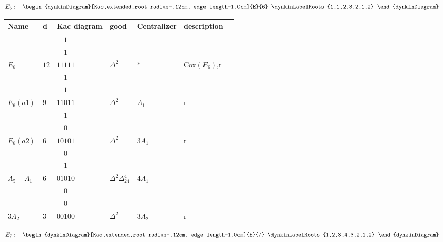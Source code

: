 \documentclass[10pt,leqno]{article}
\newcommand{\cox}{\text{Cox}}
\begin{document}
\newpage

$$
E_6:\quad \begin{dynkinDiagram}[Kac,extended,root radius=.12cm, edge length=1.0cm]{E}{6}
\dynkinLabelRoots{1,1,2,3,2,1,2}
\end{dynkinDiagram}
$$

\medskip

\begin{tabular}{|l|l|l|l|l|l|l|}
  \hline
  Name&   d &  Kac diagram &good&Centralizer&description\\\hline
      &         &      $\phantom{11}1$&&&\\
      &         &      $\phantom{11}1$&&&\\
  $E_6$ & $12$ &   $11111$ & $\Delta^2$&$*$ & $\cox(E_6)$,r\\\hline
        &          &      $\phantom{11}1$&&&\\
      &         &      $\phantom{11}1$&&&\\
  $E_6(a1)$ & $9$ &   $11011$ & $\Delta^2$&$A_1$ &r\\\hline
        &         &      $\phantom{11}1$&&&\\
      &         &      $\phantom{11}0$&&&\\
  $E_6(a2)$ & $6$ &  $10101$ & $\Delta^2$&$3A_1$ &r\\\hline
             &  &      $\phantom{11}0$&&&\\
&           &          $\phantom{11}1$&&&\\
  $A_5+A_1$ & $6$ &  $01010$ & $\Delta^2\Delta_{24}^4$&$4A_1$ &\\\hline
            &  &      $\phantom{11}0$&&&\\
 &          &          $\phantom{11}0$&&&\\
  $3A_2$ & $3$ &   $00100$ & $\Delta^2$&$3A_2$ &r \\\hline
\end{tabular}

\newpage

$$
E_7:\quad \begin{dynkinDiagram}[Kac,extended,root radius=.12cm, edge length=1.0cm]{E}{7}
\dynkinLabelRoots{1,2,3,4,3,2,1,2}
\end{dynkinDiagram}
$$
\end{document}
